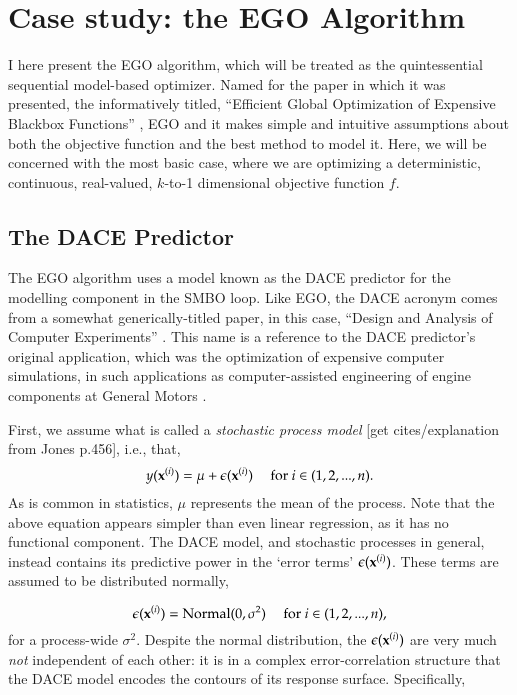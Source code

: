 \chapter{Case study: the EGO Algorithm}\label{ch:ego}
I here present the EGO algorithm, which will be treated as the quintessential sequential model-based optimizer.
Named for the paper in which it was presented, the informatively titled, ``Efficient Global Optimization of Expensive Blackbox Functions'' \cite{jones_efficient_1998}, EGO and it makes simple and intuitive assumptions about both the objective function and the best method to model it. Here, we will be concerned with the most basic case, where we are optimizing a deterministic, continuous, real-valued, $k$-to-1 dimensional objective function $f$.

\section{The DACE Predictor}\label{sec:dace}
The EGO algorithm uses a model known as the DACE predictor for the modelling component in the SMBO loop. Like EGO, the DACE acronym comes from a somewhat generically-titled paper, in this case, ``Design and Analysis of Computer Experiments'' \cite{sacks_design_1989}. This name is a reference to the DACE predictor's original application, which was the optimization of expensive computer simulations, in such applications as computer-assisted engineering of engine components at General Motors \cite{jones_efficient_1998}.

First, we assume what is called a \emph{stochastic process model} [get cites/explanation from Jones p.456], i.e., that,
\begin{equation} \label{eq:stoch_proc}
y(\mathbf{x}^{(i)}) = \mu + \epsilon(\mathbf{x}^{(i)}) \ \ \ \ \ \text{for } i \in (1,2,...,n).
\end{equation}
As is common in statistics, $\mu$ represents the mean of the process. Note that the above equation appears simpler than even linear regression, as it has no functional component. The DACE model, and stochastic processes in general, instead contains its predictive power in the `error terms' $\epsilon(\mathbf{x}^{(i)})$. These terms are assumed to be distributed normally,

\begin{equation} \label{eq:dace_err}
\epsilon(\mathbf{x}^{(i)}) = \text{Normal}(0,\sigma^2)\ \ \ \ \ \text{for } i \in (1,2,...,n),
\end{equation}
for a process-wide $\sigma^2$. Despite the normal distribution, the $\epsilon(\mathbf{x}^{(i)})$ are very much \emph{not} independent of each other: it is in a complex error-correlation structure that the DACE model encodes the contours of its response surface. Specifically,


